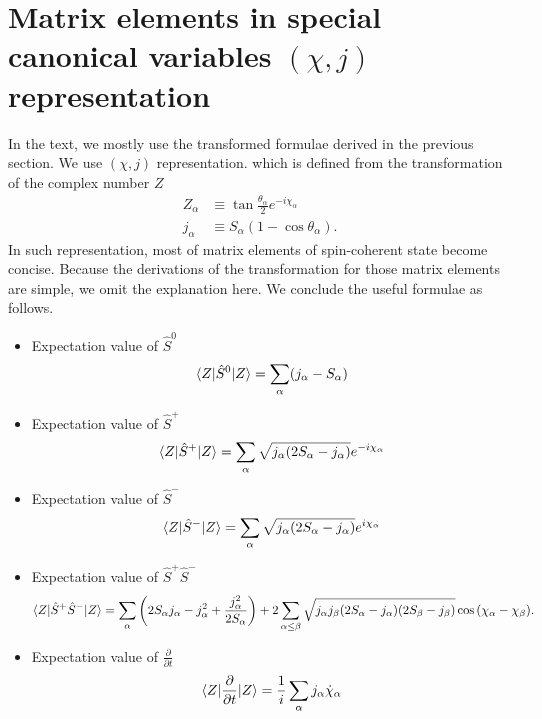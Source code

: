 \documentclass[11pt]{book} %
\begin{document}
\section{Matrix elements in special canonical variables $(\chi,j)$ representation}
\label{formula2}
In the text, we mostly use the transformed formulae derived in the previous section.
We use $(\chi,j)$ representation. which is defined from the transformation of the complex number $Z$
\begin{align}
  Z_{\alpha} &\equiv \tan{\frac{\theta_{\alpha}}{2}}e^{-i\chi_{\alpha}} \\
  j_{\alpha} &\equiv S_{\alpha}(1-\cos{\theta}_{\alpha}) .
\end{align}
In such representation, most of matrix elements of spin-coherent state become concise. Because the derivations of the transformation for those matrix elements are simple, we omit the explanation here. We conclude the useful formulae as follows.
\begin{framed}
  \begin{itemize}
 \item Expectation value of $\hat{S}^0$
\begin{equation}
     \braket{Z|\hat{S}^0|Z} = \sum_{\alpha} (j_{\alpha}-S_{\alpha})
\end{equation}
 \item Expectation value of $\hat{S}^+$
\begin{equation}
     \braket{Z|\hat{S}^+|Z} = \sum_{\alpha} \sqrt{j_{\alpha}(2S_{\alpha}-j_{\alpha})}e^{-i\chi_{\alpha}}
\end{equation}
 \item Expectation value of $\hat{S}^-$
\begin{equation}
     \braket{Z|\hat{S}^-|Z} = \sum_{\alpha} \sqrt{j_{\alpha}(2S_{\alpha}-j_{\alpha})}e^{i\chi_{\alpha}}
\end{equation}
 \item Expectation value of $\hat{S}^+\hat{S}^-$
\begin{equation}
    \braket{Z|\hat{S}^+\hat{S}^-|Z} = \sum_{\alpha} \left( 2S_{\alpha} j_{\alpha} - j_{\alpha}^2 +\frac{j_{\alpha}^2}{2S_{\alpha}} \right) 
+ 2\sum_{\alpha\le \beta} \sqrt{j_{\alpha}j_{\beta}(2S_{\alpha}-j_{\alpha})(2S_{\beta}-j_{\beta})}\cos{(\chi_{\alpha}-\chi_{\beta})}   .
\end{equation}
 \item Expectation value of $\frac{\partial}{\partial t}$
\begin{equation}
       \braket{Z|\frac{\partial}{\partial t}|Z} = \frac{1}{i}\sum_{\alpha} j_{\alpha} \dot{\chi}_{\alpha}
	\label{ddt2}
\end{equation}
\end{itemize}
\end{framed}
\end{document}
